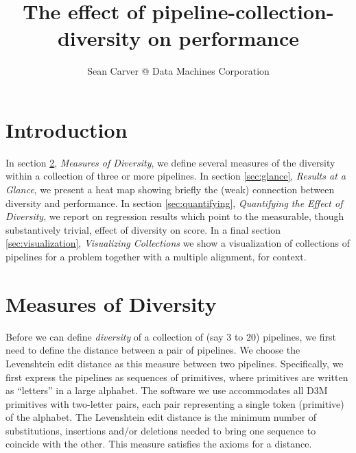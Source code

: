 \documentclass{article}
\title{The effect of pipeline-collection-diversity on performance}
\author{Sean Carver @ Data Machines Corporation}
\begin{document}
\maketitle


\section{Introduction}
In section \ref{sec:measures}, \emph{Measures of Diversity}, we define
several measures of the diversity within a collection of three or more
pipelines. In section \ref{sec:glance}, \emph{Results at a Glance}, we present a
heat map showing briefly the (weak) connection between diversity and
performance. In section \ref{sec:quantifying}, \emph{Quantifying the Effect of Diversity}, we report on regression results which point to the measurable, though substantively trivial, effect of diversity on score. In a final section \ref{sec:visualization}, \emph{Visualizing Collections} we show a  visualization of collections of
pipelines for a problem together with a multiple alignment, for context.

\section{Measures of Diversity}
\label{sec:measures}
Before we can define \emph{diversity} of a collection of (say 3 to 20)
pipelines, we first need to define the distance between a pair of pipelines.
We choose the Levenshtein edit distance as this measure between two
pipelines.  Specifically, we first express the pipelines as sequences
of primitives, where primitives are written as ``letters'' in a large
alphabet.  The software we use accommodates all D3M primitives with
two-letter pairs, each pair representing a single token
(primitive) of the alphabet.  The Levenshtein edit distance is the
minimum number of substitutions, insertions and/or deletions needed to
bring one sequence to coincide with the other.  This measure satisfies
the axioms for a distance.
\end{document}
